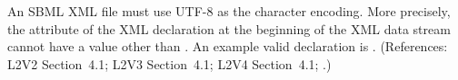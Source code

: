 An SBML XML file must use UTF-8 as the character encoding.  More
precisely, the  attribute of the XML declaration
at the beginning of the XML data stream cannot have a value other
than .  An example valid declaration is .  (References: L2V2
Section~4.1; L2V3 Section~4.1; L2V4 Section~4.1; .)
